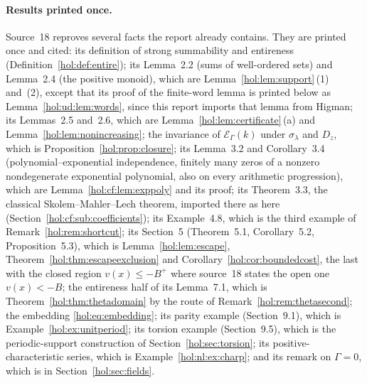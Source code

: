 \documentclass[11pt]{article}
\numberwithin{equation}{section}
\theoremstyle{definition}
\theoremstyle{remark}
\newcommand{\EK}{\mathcal E_\Gamma(k)}
\begin{document}
\paragraph{Results printed once.}
Source~18 reproves several facts the report already contains. They are
printed once and cited: its definition of strong summability and entireness
(Definition~\ref{hol:def:entire}); its Lemma~2.2 (sums of well-ordered sets)
and Lemma~2.4 (the positive monoid), which are
Lemma~\ref{hol:lem:support}\,(1) and~(2), except that its proof of the
finite-word lemma is printed below as Lemma~\ref{hol:ud:lem:words}, since this
report imports that lemma from Higman; its Lemmas~2.5 and~2.6, which are
Lemma~\ref{hol:lem:certificate}\,(a) and Lemma~\ref{hol:lem:nonincreasing};
the invariance of $\EK$ under $\sigma_\lambda$ and $D_z$, which is
Proposition~\ref{hol:prop:closure}; its Lemma~3.2 and Corollary~3.4
(polynomial--exponential independence, finitely many zeros of a nonzero
nondegenerate exponential polynomial, also on every arithmetic progression),
which are Lemma~\ref{hol:cf:lem:exppoly} and its proof; its Theorem~3.3, the
classical Skolem--Mahler--Lech theorem, imported there as here
(Section~\ref{hol:cf:sub:coefficients}); its Example~4.8, which is the third
example of Remark~\ref{hol:rem:shortcut}; its Section~5 (Theorem~5.1,
Corollary~5.2, Proposition~5.3), which is Lemma~\ref{hol:lem:escape},
Theorem~\ref{hol:thm:escapeexclusion} and Corollary~\ref{hol:cor:boundedcost},
the last with the closed region $v(x)\le-B^+$ where source~18 states the open
one $v(x)<-B$; the entireness half of its Lemma~7.1, which is
Theorem~\ref{hol:thm:thetadomain} by the route of
Remark~\ref{hol:rem:thetasecond}; the embedding \eqref{hol:eq:embedding}; its
parity example (Section~9.1), which is Example~\ref{hol:ex:unitperiod}; its
torsion example (Section~9.5), which is the periodic-support construction of
Section~\ref{hol:sec:torsion}; its positive-characteristic series, which is
Example~\ref{hol:nl:ex:charp}; and its remark on $\Gamma=0$, which is in
Section~\ref{hol:sec:fields}.
\end{document}
